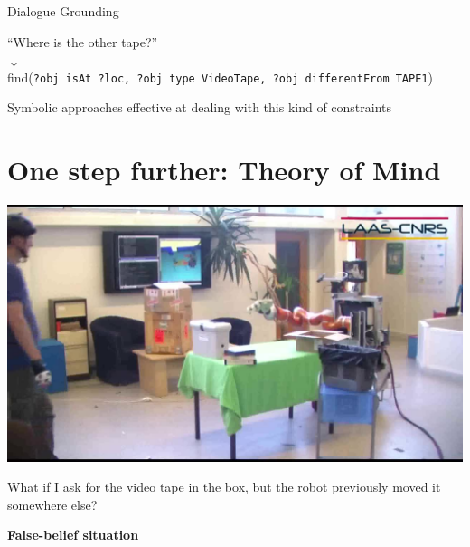 \documentclass[compress]{beamer}
\begin{document}


{
\begin{frame}{Dialogue Grounding}
    \centering

    \vspace*{2em}
    ``Where is the other tape?''\\
    $\downarrow$\\
    find({\tt\scriptsize ?obj isAt ?loc, ?obj type VideoTape, ?obj differentFrom TAPE1})

    \pause

    \vspace*{2em}
    Symbolic approaches effective at dealing with this kind of constraints

\end{frame}
}


\section{One step further: Theory of Mind}

\begin{frame}[plain]

    \begin{center}
        \includegraphics[width=0.8\linewidth]{videos/this_box_thumb}

        What if I ask for the video tape in the box, but the robot previously
        moved it somewhere else?


    \pause

        {\bf False-belief situation}
    \end{center}
\end{frame}
\end{document}
